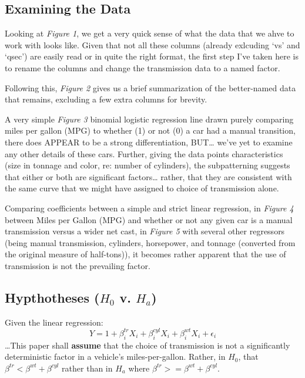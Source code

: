 \documentclass[]{article}
\begin{document}
\subsection{Examining the Data}\label{examining-the-data}

Looking at \emph{Figure 1}, we get a very quick sense of what the data
that we ahve to work with looks like. Given that not all these columns
(already exlcuding `vs' and `qsec') are easily read or in quite the
right format, the first step I've taken here is to rename the columns
and change the transmission data to a named factor.

Following this, \emph{Figure 2} gives us a brief summarization of the
better-named data that remains, excluding a few extra columns for
brevity.

A very simple \emph{Figure 3} binomial logistic regression line drawn
purely comparing miles per gallon (MPG) to whether (1) or not (0) a car
had a manual transition, there does APPEAR to be a strong
differentiation, BUT\ldots{} we've yet to examine any other details of
these cars. Further, giving the data points characteristics (size in
tonnage and color, re: number of cylinders), the subpatterning suggests
that either or both are significant factors\ldots{} rather, that they
are consistent with the same curve that we might have assigned to choice
of transmission alone.

Comparing coefficients between a simple and strict linear regression, in
\emph{Figure 4} between Miles per Gallon (MPG) and whether or not any
given car is a manual transmission versus a wider net cast, in
\emph{Figure 5} with several other regressors (being manual
transmission, cylinders, horsepower, and tonnage (converted from the
original measure of half-tons)), it becomes rather apparent that the use
of transmission is not the prevailing factor. \newpage

\subsection{Hypthotheses (\(H_{0}\) v.
\(H_{a}\))}\label{hypthotheses-hux5f0-v.-hux5fa}

Given the linear regression:
\[Y = 1 + \beta^{tr}_{i}X_{i} + \beta^{cyl}_{i}X_{i} + \beta^{wt}_{i}X_{i} + \epsilon_{i}\]
\ldots{}This paper shall \textbf{assume} that the choice of transmission
is not a significantly deterministic factor in a vehicle's
miles-per-gallon. Rather, in \(H_{0}\), that
\(\beta^{tr} < \beta^{wt} + \beta^{cyl}\) rather than in \(H_{a}\) where
\(\beta^{tr} >= \beta^{wt} + \beta^{cyl}\).
\end{document}
